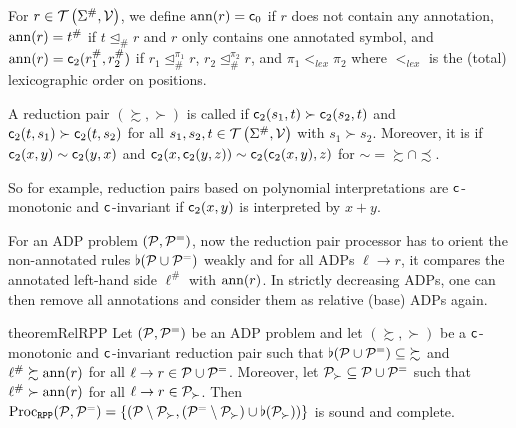 \begin{definition}\label{def:poly-interpretation-for-depset}
    For $r \in \mathcal{T}\left(\Sigma^\#,\mathcal{V}\right)$, we define
    $\mathrm{ann}(r) = \mathsf{c}_{0}$ if $r$ does not contain any annotation,
    $\mathrm{ann}(r) = t^\#$ if $t \trianglelefteq_{\#} r$ and $r$ only contains one annotated symbol,
    and $\mathrm{ann}(r) = \mathsf{c}_{2}(r_1^\#, r_2^\#)$ if $r_1 \trianglelefteq_{\#}^{\pi_1} r$,
    $r_2 \trianglelefteq_{\#}^{\pi_2} r$, 
    and $\pi_1 <_{lex} \pi_2$ where $<_{lex}$ is the (total)
    lexicographic order on positions.

    A reduction pair $(\succsim, \succ)$ is called 
    if $\mathsf{c}_{2}(s_1, t) \succ
    \mathsf{c}_{2}(s_2, t)$ and $\mathsf{c}_{2}(t, s_1) \succ
    \mathsf{c}_{2}(t, s_2)$ for all $s_1,s_2,t \in \mathcal{T}\left(\Sigma^\#,\mathcal{V}\right)$ with $s_1 \succ s_2$.
    Moreover, it is  
    if $\mathsf{c}_{2}(x,y) \sim \mathsf{c}_{2}(y,x)$ and
    $\mathsf{c}_{2}(x,\mathsf{c}_{2}(y,z)) \sim 
    \mathsf{c}_{2}(\mathsf{c}_{2}(x,y),z)$
    for ${\sim} = {\succsim} \cap {\precsim}$. 
\end{definition}
So for example, reduction pairs based on polynomial interpretations are
$\mathsf{c}_{}$-monotonic and $\mathsf{c}_{}$-invariant if $\mathsf{c}_{2}(x,y)$ is interpreted by $x + y$.

For an ADP problem $(\mathcal{P},\mathcal{P}^{=})$, 
now the reduction pair processor has to orient the non-annotated rules $\flat(\mathcal{P} \cup
\mathcal{P}^{=})$ weakly and for all ADPs $\ell \to r$,
it compares the annotated left-hand side  $\ell^\#$ with
$\mathrm{ann}(r)$. In strictly decreasing ADPs, one can then remove all annotations and consider
them as relative (base) ADPs again.

\begin{restatable}{theorem}{RelRPP}\label{thm:RelRPP}
    Let $(\mathcal{P},\mathcal{P}^{=})$ be an ADP problem and let
    $(\succsim, \succ)$ be a $\mathsf{c}_{}$-monotonic and $\mathsf{c}_{}$-invariant reduction pair
    such that $\flat(\C{P} \cup \C{P}^{=})\linebreak \subseteq {\succsim}$ and
    $\ell^\# \succsim \mathrm{ann}(r)$ for all $\ell \to r \in \mathcal{P} \cup \mathcal{P}^{=}$.
    Moreover, let $\mathcal{P}_{\succ} \subseteq \mathcal{P} \cup \mathcal{P}^{=}$ 
    such that\linebreak $\ell^\# \succ \mathrm{ann}(r)$ for all $\ell \to r \in \mathcal{P}_{\succ}$. 
    Then $\operatorname{Proc}_{\mathtt{RPP}}(\mathcal{P},\mathcal{P}^{=}) = \{(\mathcal{P} \setminus \mathcal{P}_{\succ}, (\mathcal{P}^{=} \setminus \mathcal{P}_{\succ}) \cup
    \flat(\mathcal{P}_{\succ}))\}$ is sound and complete.
\end{restatable}

